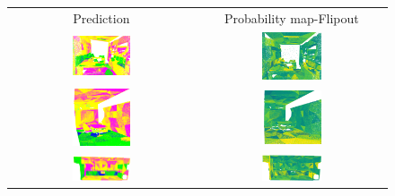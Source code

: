     \begin{figure}[h!]
        \centering
        \begin{tabular}{cc}
            Prediction & Probability map-Flipout \\
            \includegraphics[width=0.33\textwidth, height=0.18\textheight]{images/seg_output/s3dis_DE/office_3.png}& 
            \includegraphics[width=0.33\textwidth, height=0.18\textheight]{images/seg_output/s3dis_DE/fout_1.png}\\

            \includegraphics[width=0.33\textwidth, height=0.18\textheight]{images/seg_output/s3dis_DE/ocroom_1.png}& 
            \includegraphics[width=0.33\textwidth, height=0.18\textheight]{images/seg_output/s3dis_DE/fout_2.png}\\

            \includegraphics[width=0.33\textwidth, height=0.18\textheight]{images/seg_output/s3dis_DE/opantry_1.png}& 
            \includegraphics[width=0.33\textwidth, height=0.18\textheight]{images/seg_output/s3dis_DE/fout_3.png}\\


\end{tabular}
\end{figure}
